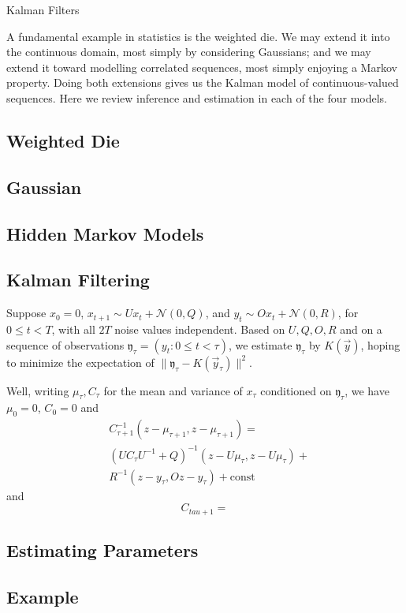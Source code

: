 \documentclass[twocolumn, 11pt]{article}
\newcommand{\msec}[1]{\subsection*{\color{mblu}\textsf{#1}}}
\theoremstyle{definition}
\begin{document}
{
    \centering \Huge \sf \color{mblu} 
    Kalman Filters
}


    A fundamental example in statistics is the weighted die.  We may extend it
    into the continuous domain, most simply by considering Gaussians; and we
    may extend it toward modelling correlated sequences, most simply enjoying a
    Markov property.  Doing both extensions gives us the Kalman model of
    continuous-valued sequences.  Here we review inference and estimation in
    each of the four models.

    \msec{Weighted Die}

    \msec{Gaussian}
    \msec{Hidden Markov Models}
    \msec{Kalman Filtering}
        Suppose $x_0 = 0 $,  $x_{t+1} \sim U x_t +
        \mathcal{N}(0, Q)$, and $y_t \sim O x_t + \mathcal{N}(0, R)$, for
        $0\leq t<T$, with all $2T$ noise values independent.  Based on
        $U,Q,O,R$ and on a sequence of observations $\mathfrak{y}_\tau = (y_t : 0\leq
        t<\tau)$, we estimate $\mathfrak{y}_\tau$ by $K(\vec y)$, hoping to minimize the
        expectation of $\|\mathfrak{y}_\tau - K(\vec y_\tau)\|^2$.

        Well, writing $\mu_\tau, C_\tau$ for the mean and variance of $x_\tau$
        conditioned on $\mathfrak{y}_\tau$, we have $\mu_0 = 0$, $C_0 = 0$ and
        \begin{align*}
            &C_{\tau+1}^{-1}(z - \mu_{\tau+1}, z - \mu_{\tau+1})
            =\\
            &(UC_\tau U^{-1} + Q)^{-1}(z - U \mu_\tau, z - U\mu_\tau)  
            +\\
            &R^{-1}(z - y_\tau, O z - y_\tau)
            + \text{const}
        \end{align*}
        and
        $$
            C_{tau+1} =  
        $$

    \msec{Estimating Parameters}
    \msec{Example}

\end{document}
